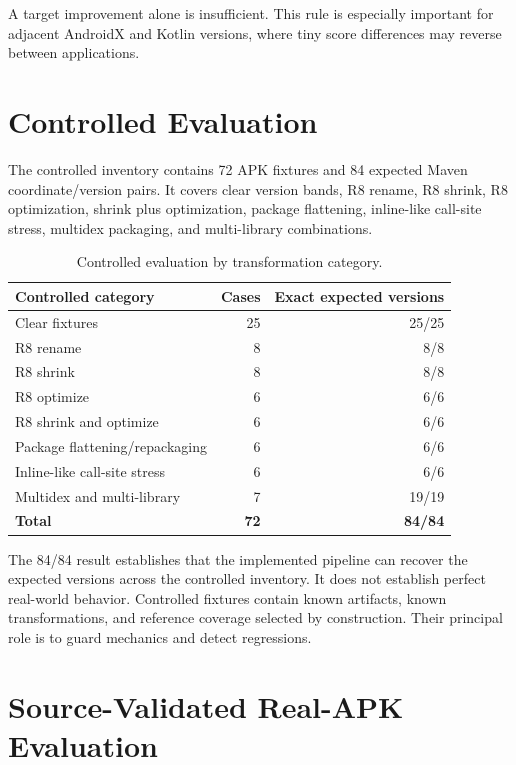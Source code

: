 A target improvement alone is insufficient. This rule is especially important
for adjacent AndroidX and Kotlin versions, where tiny score differences may
reverse between applications.

\section{Controlled Evaluation}

The controlled inventory contains 72 APK fixtures and 84 expected Maven
coordinate/version pairs. It covers clear version bands, R8 rename, R8 shrink,
R8 optimization, shrink plus optimization, package flattening, inline-like
call-site stress, multidex packaging, and multi-library combinations.

\begin{table}[H]
\centering
\caption{Controlled evaluation by transformation category.}
\label{tab:pfe-controlled-categories}
\begin{tabularx}{\textwidth}{Xrr}
\toprule
\textbf{Controlled category} & \textbf{Cases} & \textbf{Exact expected versions}\\
\midrule
Clear fixtures & 25 & 25/25\\
R8 rename & 8 & 8/8\\
R8 shrink & 8 & 8/8\\
R8 optimize & 6 & 6/6\\
R8 shrink and optimize & 6 & 6/6\\
Package flattening/repackaging & 6 & 6/6\\
Inline-like call-site stress & 6 & 6/6\\
Multidex and multi-library & 7 & 19/19\\
\midrule
\textbf{Total} & \textbf{72} & \textbf{84/84}\\
\bottomrule
\end{tabularx}
\end{table}

The 84/84 result establishes that the implemented pipeline can recover the
expected versions across the controlled inventory. It does not establish
perfect real-world behavior. Controlled fixtures contain known artifacts,
known transformations, and reference coverage selected by construction.
Their principal role is to guard mechanics and detect regressions.

\section{Source-Validated Real-APK Evaluation}

